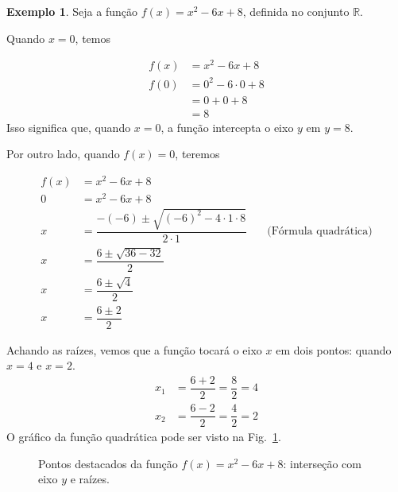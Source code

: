 \documentclass[12pt,openright,twoside,a4paper]{article}
\theoremstyle{definition}
\newtheorem{example}{Exemplo}[section]
\begin{document}
	\begin{example}\label{ex:f_x2-6x+8}
		Seja a função $f(x) = x^2 -6x + 8$, definida no conjunto $\mathbb{R}$.
		
		Quando $x=0$, temos 
		
		\begin{align*}
			f(x) &= x^2 -6x + 8 \\
			f(0) &=  0^2 -6 \cdot 0 + 8 \\
			&= 0 + 0 + 8 \\
			&= 8
		\end{align*}
		Isso significa que, quando $x=0$, a função intercepta o eixo $y$ em $y=8$.
		
		Por outro lado, quando $f(x) = 0$, teremos
		
		\begin{align*}
			f(x) &= x^2 -6x + 8 \\
			0 &= x^2 -6x + 8 \\
			x &= \dfrac{-(-6) \pm \sqrt{(-6)^2 - 4 \cdot 1 \cdot 8}}{2 \cdot 1} \quad &\text{(Fórmula quadrática)}\\
			x &= \dfrac{6 \pm \sqrt{36 - 32}}{2} \\
			x &= \dfrac{6 \pm \sqrt{4}}{2} \\
			x &= \dfrac{6 \pm 2}{2}
		\end{align*}
		
		Achando as raízes, vemos que a função tocará o eixo $x$ em dois pontos: quando $x=4$ e $x=2$.
		\begin{align*}
			x_1 &= \dfrac{6 + 2}{2} = \dfrac{8}{2} = 4 \\
			x_2 &= \dfrac{6 - 2}{2} = \dfrac{4}{2} = 2
		\end{align*}
		O gráfico da função quadrática pode ser visto na Fig.~\ref{fig:pontos-funcao-quadratica}.
		
		\begin{figure}[h]
			\centering
			\caption{Pontos destacados da função $f(x) = x^2 - 6x + 8$: interseção com eixo $y$ e raízes.}
			\label{fig:pontos-funcao-quadratica}
		\end{figure}
	\end{example}
	
\end{document}
